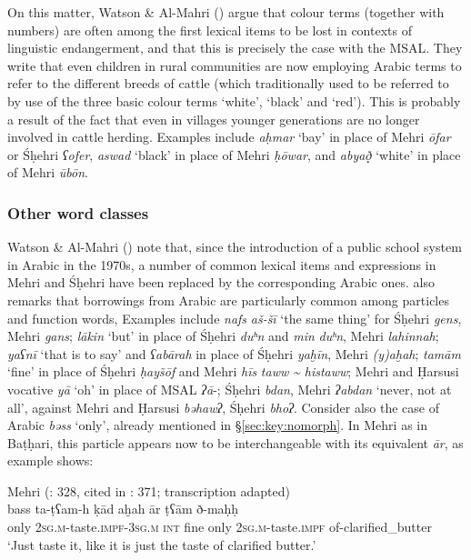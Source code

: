 \documentclass[output=paper]{langsci/langscibook}
\begin{document}
On this matter, Watson \& Al-Mahri (\citeyear[90]{WatsonAl-Mahri2017}) argue that colour terms (together with numbers) are often among the first lexical items to be lost in contexts of linguistic endangerment, and that this is precisely the case with the MSAL. They write that even children in rural communities are now employing Arabic terms to refer to the different breeds of cattle (which traditionally used to be referred to by use of the three basic colour terms ‘white’, ‘black’ and ‘red’). This is probably a result of the fact that even in villages younger generations are no longer involved in cattle herding. Examples include \textit{aḥmar} ‘bay’ in place of Mehri \textit{ōfar} or Śḥehri \textit{ʕofer}, \textit{aswad} ‘black’ in place of Mehri \textit{ḥōwar}, and \textit{abya\d{ð}}̣ ‘white’ in place of Mehri \textit{ūbōn}.


 \subsubsection{Other word classes}

Watson \& Al-Mahri (\citeyear[90]{WatsonAl-Mahri2017}) note that, since the introduction of a public school system in Arabic in the 1970s, a number of common lexical items and expressions in Mehri and Śḥehri have been replaced by the corresponding Arabic ones. \citet{Lonnet2011} also remarks that borrowings from Arabic are particularly common among particles and function words, Examples include \textit{nafs} \textit{aš-šī} ‘the same thing’ for Śḥehri \textit{gens}, Mehri \textit{gans}; \textit{lākin} ‘but’ in place of Śḥehri \textit{duʰn} and \textit{min} \textit{duʰn}, Mehri \textit{lahinnah}; \textit{yaʕnī} ‘that is to say’ and \textit{ʕabārah} in place of Śḥehri \textit{yaḫīn}, Mehri \textit{(y)aḫah}; \textit{tamām} ‘fine’ in place of Śḥehri \textit{ḥay\~{s}ōf} and Mehri \textit{hīs} \textit{taww} \textit{{\textasciitilde} histaww}; Mehri and Ḥarsusi vocative \textit{yā} ‘oh’ in place of MSAL \textit{ʔā}-; Śḥehri \textit{bdan}, Mehri \textit{ʔabdan} ‘never, not at all’, against Mehri and Ḥarsusi \textit{bəhawʔ}, Śḥehri \textit{bhoʔ}. Consider also the case of Arabic \textit{bəss} ‘only’, already mentioned in §\ref{sec:key:nomorph}. In Mehri as in Baṭḥari, this particle appears now to be interchangeable with its equivalent \textit{ār}, as example  shows:

\ea\label{ex:key:sima}
{Mehri (\citealt{Sima2009}: 328, cited in \citealt{Watson2012}: 371; transcription adapted)}\\
\gll bass ta-ṭʕam-h ḳād aḫah ār ṭʕām ð-maḥḥ\\
     only 2\textsc{sg.m}-taste.\textsc{impf-3sg.m} \textsc{int} fine only 2\textsc{sg.m}-taste.\textsc{impf} of-clarified\_butter\\
\glt `Just taste it, like it is just the taste of clarified butter.' 
\z
\end{document}
